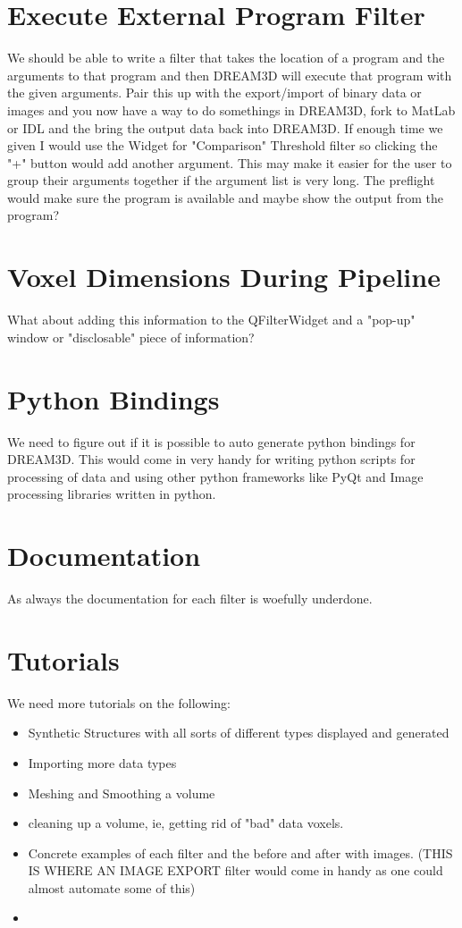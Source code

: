 \documentclass[12pt]{article} %
\begin{document}
   
\section{Execute External Program Filter}
	We should be able to write a filter that takes the location of a program and the arguments to that program and then DREAM3D will execute that program with the given arguments. Pair this up with the export/import of binary data or images and you now have a way to do somethings in DREAM3D, fork to MatLab or IDL and the bring the output data back into DREAM3D. If enough time we given I would use the Widget for "Comparison" Threshold filter so clicking the "+" button would add another argument. This may make it easier for the user to group their arguments together if the argument list is very long. The preflight would make sure the program is available and maybe show the output from the program?

 
   
\section{Voxel Dimensions During Pipeline}
What about adding this information to the QFilterWidget and a "pop-up" window or "disclosable" piece of information?

  
\section{Python Bindings}
  We need to figure out if it is possible to auto generate python bindings for DREAM3D. This would come in very handy for writing python scripts for processing of data and using other python frameworks like PyQt and Image processing libraries written in python.
  
\section{Documentation}
  As always the documentation for each filter is woefully underdone.
  
\section{Tutorials}
  We need more tutorials on the following:
  \begin{itemize}
  \item Synthetic Structures with all sorts of different types displayed and generated
  \item Importing more data types
  \item Meshing and Smoothing a volume
  \item cleaning up a volume, ie, getting rid of "bad" data voxels.
  \item Concrete examples of each filter and the before and after with images. (THIS IS WHERE AN IMAGE EXPORT filter would come in handy as one could almost automate some of this)
  \item 
  \end{itemize}
\end{document}
